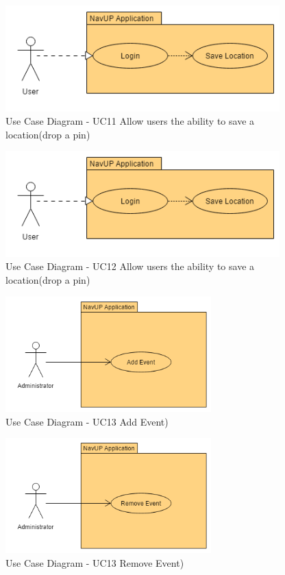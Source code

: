 		\graphicspath{ {./Images/User/} }
		\begin{figure}[h]
		\caption{Use Case Diagram - UC11  Allow users the ability to save a location(drop a pin)}
		\includegraphics[width = 400px]{SaveLocation.png}
		\end{figure}

\graphicspath{ {./Images/User/} }
		\begin{figure}[h]
		\caption{Use Case Diagram - UC12  Allow users the ability to save a location(drop a pin)}
		\includegraphics[width = 400px]{SaveLocation.png}
		\end{figure}

		\graphicspath{ {./Images/Administrator/} }
		\begin{figure}[h]
		\caption{Use Case Diagram - UC13 Add Event)}
		\includegraphics[width = 300px]{AddEvent.png}
		\end{figure}
		
		\graphicspath{ {./Images/Administrator/} }
		\begin{figure}[h]
		\caption{Use Case Diagram - UC13 Remove Event)}
		\includegraphics[width = 300px]{RemoveEvent.png}
		\end{figure}

